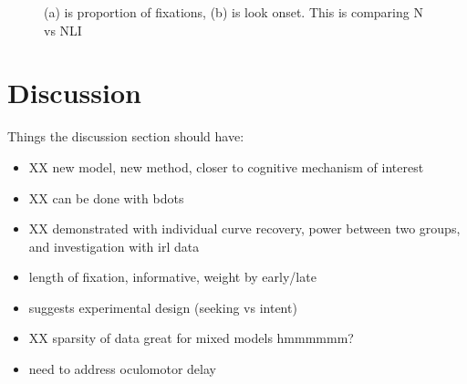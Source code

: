 \documentclass{article}
\begin{document}
\begin{figure}[H]
    \centering
    \caption{(a) is proportion of fixations, (b) is look onset. This is comparing N vs NLI}
\label{fig:irldata2}
\end{figure}


\section{Discussion}

Things the discussion section should have:
\begin{singlespace}
\begin{itemize}
\item XX new model, new method, closer to cognitive mechanism of interest
\item XX can be done with bdots
\item XX demonstrated with individual curve recovery, power between two groups, and investigation with irl data
\item length of fixation, informative, weight by early/late
\item suggests experimental design (seeking vs intent)
\item XX sparsity of data great for mixed models hmmmmmm?
\item need to address oculomotor delay
\end{itemize}
\end{singlespace}
\end{document}
